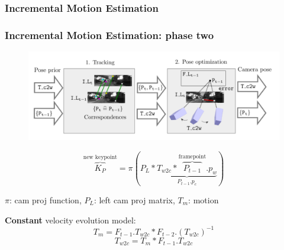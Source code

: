 \documentclass[16pt]{beamer}
\begin{document}
\subsubsection*{Incremental Motion Estimation}
\begin{frame}
  \frametitle{Incremental Motion Estimation: phase two}

  \begin{figure}
    \centering
    \includegraphics[width=.8\textwidth]{slam2}
  \end{figure}
  \begin{equation}
    \overbrace{K_P}^{\text{new keypoint}} = \pi( P_L* \underbrace{T_{w2c}*\overbrace{P_{t-1}}^{\text{framepoint}}.p_w }_{P_{t-1}.p_c})
  \end{equation}
  \begin{center}
  $\pi$: cam proj function, $P_{L}$: left cam proj matrix, $T_m$: motion
  \end{center}
  \begin{block}{\textbf{Constant} velocity evolution model:}
    \begin{equation}
      T_m = F_{t-1}.T_{w2c}*F_{t-2}.(T_{w2c})^{-1}
    \end{equation}
    \begin{equation}
      T_{w2c} = T_m* F_{t-1}.T_{w2c}
    \end{equation}
  \end{block}
\end{frame}
\end{document}
